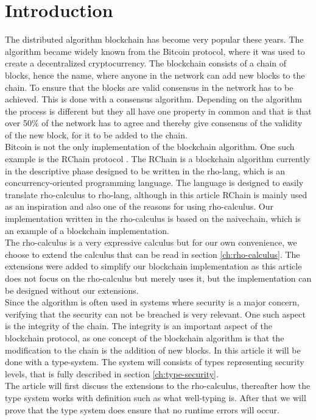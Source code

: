 \section{Introduction}
The distributed algorithm blockchain has become very popular these years. The algorithm became widely known from the Bitcoin protocol, where it was used to create a decentralized cryptocurrency\citep{website:blockchain}. The blockchain consists of a chain of blocks, hence the name, where anyone in the network can add new blocks to the chain. To ensure that the blocks are valid consensus in the network has to be achieved. This is done with a consensus algorithm. Depending on the algorithm the process is different but they all have one property in common and that is that over 50\% of the network has to agree and thereby give consensus of the validity of the new block, for it to be added to the chain.\\
Bitcoin is not the only implementation of the blockchain algorithm. One such example is the RChain protocol \citep{website:RChain}. The RChain is a blockchain algorithm currently in the descriptive phase designed to be written in the rho-lang, which is an concurrency-oriented programming language. The language is designed to easily translate rho-calculus to rho-lang\citep{website:rho-lang}, although in this article RChain is mainly used as an inspiration and also one of the reasons for using rho-calculus. Our implementation written in the rho-calculus is based on the naivechain, which is an example of a blockchain implementation\citep{naivechain}.\\

The rho-calculus is a very expressive calculus but for our own convenience, we choose to extend the calculus that can be read in section \ref{ch:rho-calculus}. The extensions were added to simplify our blockchain implementation as this article does not focus on the rho-calculus but merely uses it, but the implementation can be designed without our extensions.\\

Since the algorithm is often used in systems where security is a major concern, verifying that the security can not be breached is very relevant. One such aspect is the integrity of the chain.
The integrity is an important aspect of the blockchain protocol, as one concept of the blockchain algorithm is that the modification to the chain is the addition of new blocks. In this article it will be done with a type-system. The system will consists of types representing security levels, that is fully described in section \ref{ch:type-security}.\\

The article will first discuss the extensions to the rho-calculus, thereafter how the type system works with definition such as what well-typing is. After that we will prove that the type system does ensure that no runtime errors will occur.
